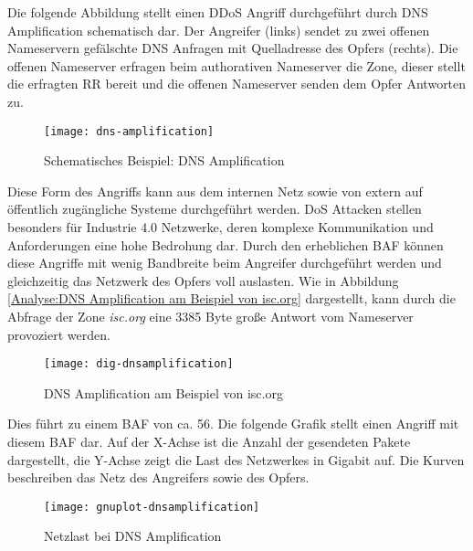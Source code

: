 Die folgende Abbildung stellt einen \ac{DDoS} Angriff durchgeführt durch \ac{DNS} Amplification schematisch dar. Der Angreifer (links) sendet zu zwei offenen Nameservern gefälschte \ac{DNS} Anfragen mit Quelladresse des Opfers (rechts). Die offenen Nameserver erfragen beim authorativen Nameserver die Zone, dieser stellt die erfragten \ac{RR} bereit und die offenen Nameserver senden dem Opfer Antworten zu.

\begin{figure}[h]
    \centering
    \texttt{[image: dns-amplification]}
    \caption{Schematisches Beispiel: DNS Amplification}
    \label{Analyse:DNS Amplification}
  \end{figure}
  
\clearpage

Diese Form des Angriffs kann aus dem internen Netz sowie von extern auf öffentlich zugängliche Systeme durchgeführt werden. \ac{DoS} Attacken stellen besonders für Industrie 4.0 Netzwerke, deren komplexe Kommunikation und Anforderungen eine hohe Bedrohung dar. Durch den erheblichen \ac{BAF} können diese Angriffe mit wenig Bandbreite beim Angreifer durchgeführt werden und gleichzeitig das Netzwerk des Opfers voll auslasten. Wie in Abbildung \autoref{Analyse:DNS Amplification am Beispiel von isc.org} dargestellt, kann durch die Abfrage der Zone \textit{isc.org} eine 3385 Byte große Antwort vom Nameserver provoziert werden. 

\begin{figure}[h]
    \centering
    \texttt{[image: dig-dnsamplification]}
    \caption{DNS Amplification am Beispiel von isc.org}
    \label{Analyse:DNS Amplification am Beispiel von isc.org}
  \end{figure}
  
\clearpage

Dies führt zu einem \ac{BAF} von ca. 56. Die folgende Grafik stellt einen Angriff mit diesem \ac{BAF} dar. Auf der X-Achse ist die Anzahl der gesendeten Pakete dargestellt, die Y-Achse zeigt die Last des Netzwerkes in Gigabit auf. Die Kurven beschreiben das Netz des Angreifers sowie des Opfers.

\begin{figure}[h]
    \centering
    \texttt{[image: gnuplot-dnsamplification]}
    \caption{Netzlast bei DNS Amplification}
    \label{Analyse:Netzlast bei DNS Amplification}
  \end{figure}
  
\clearpage

